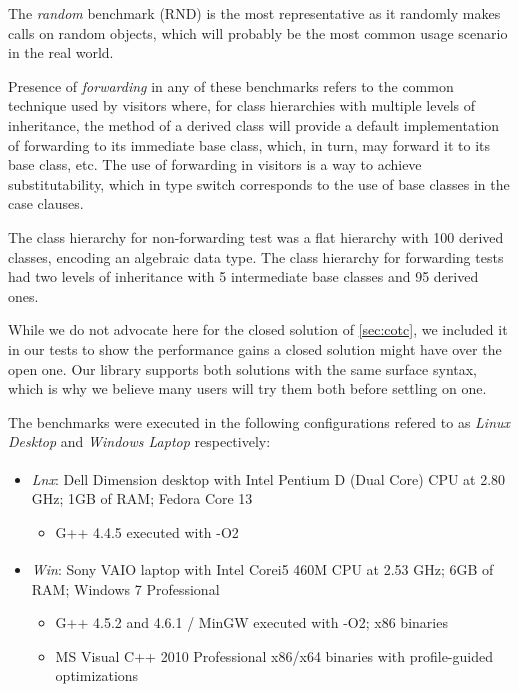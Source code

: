 The \emph{random} benchmark (RND) is the most representative as it randomly makes calls on 
random objects, which will probably be the most common usage scenario in the 
real world.

Presence of \emph{forwarding} in any of these benchmarks refers to the 
common technique used by visitors where, for class hierarchies with multiple 
levels of inheritance, the  method of a derived class will provide a 
default implementation of forwarding to its immediate base class, which, in turn, 
may forward it to its base class, etc. The use of forwarding in visitors is a 
way to achieve substitutability, which in type switch corresponds to the use 
of base classes in the case clauses.

The class hierarchy for non-forwarding test was a flat hierarchy with 100 
derived classes, encoding an algebraic data type. The class hierarchy for 
forwarding tests had two levels of inheritance with 5 intermediate base classes 
and 95 derived ones. 

While we do not advocate here for the closed solution of 
\textsection\ref{sec:cotc}, we included it in our tests to show the performance 
gains a closed solution might have over the open one. Our library supports both 
solutions with the same surface syntax, which is why we believe many users will 
try them both before settling on one. 

The benchmarks were executed in the following configurations refered to as 
\emph{Linux Desktop} and \emph{Windows Laptop} respectively:

\begin{itemize}
\setlength{\itemsep}{0pt}
\setlength{\parskip}{0pt}
\item \emph{Lnx}: Dell Dimension\textsuperscript{\textregistered} desktop with Intel\textsuperscript{\textregistered} Pentium\textsuperscript{\textregistered} 
      D (Dual Core) CPU at 2.80 GHz; 1GB of RAM; Fedora Core 13  
      \begin{itemize}
      \setlength{\itemsep}{0pt}
      \setlength{\parskip}{0pt}
      \item G++ 4.4.5 executed with -O2
      \end{itemize}
\item \emph{Win}: Sony VAIO\textsuperscript{\textregistered} laptop with Intel\textsuperscript{\textregistered} Core\texttrademark i5 460M 
      CPU at 2.53 GHz; 6GB of RAM; Windows 7 Professional
      \begin{itemize}
      \setlength{\itemsep}{0pt}
      \setlength{\parskip}{0pt}
      \item G++ 4.5.2 and 4.6.1 / MinGW executed with -O2; x86 binaries
      \item MS Visual C++ 2010 Professional x86/x64 binaries with profile-guided optimizations
      \end{itemize}
\end{itemize}

